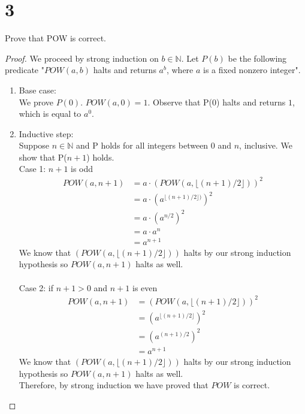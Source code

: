 \documentclass[11pt]{scrartcl}
\begin{document}
\section{3}
Prove that POW is correct.
\begin{proof}
	We proceed by strong induction on $b \in \mathbb{N}$. Let $P(b)$ be the following predicate 
	"$POW(a,b)$ halts and returns $a^b$, where $a$ is a fixed nonzero integer".
	\begin{enumerate}[label=\alph*.]
		\item{
			Base case:\\
			We prove $P(0)$. $POW(a,0) = 1$.
			Observe that P($0$) halts and returns $1$, which is equal to $a^0$.
		}
		\item{
			Inductive step:\\
			Suppose $n \in \mathbb{N}$ and P holds for all integers between 0 and $n$, inclusive. 
			We show that P($n+1$) holds.\\
			Case 1: $n+1$ is odd
			\begin{align*}
			POW(a,n+1) & = a \cdot (POW(a, \lfloor (n+1)/2 \rfloor))^2\\
			& = a \cdot (a^{\lfloor (n+1)/2 \rfloor)})^2 \tag{Strong inductive hypothesis}\\
			& = a \cdot (a^{n/2})^2 \tag{n is even}\\
			& = a \cdot a^n \\
			& = a^{n+1}
			\end{align*}
			We know that $(POW(a, \lfloor (n+1)/2 \rfloor))$ halts by our strong induction hypothesis so  
			$POW(a,n+1)$ halts as well.\\
			\-\\
			Case 2: if $n+1 > 0$ and $n+1$ is even
			\begin{align*}
				POW(a,n+1) & = (POW(a, \lfloor (n+1)/2 \rfloor))^2\\
				& = (a^{\lfloor (n+1)/2 \rfloor})^2 \tag{Strong inductive hypothesis}\\
				& = (a^{(n+1)/2})^2  \tag{n + 1 is even}\\
				& = a^{n+1}
			\end{align*}
			We know that $(POW(a, \lfloor (n+1)/2 \rfloor))$ halts by our strong induction hypothesis so  
			$POW(a,n+1)$ halts as well.\\
		}
		Therefore, by strong induction we have proved that $POW$ is correct.
	\end{enumerate}
\end{proof}
\end{document}
